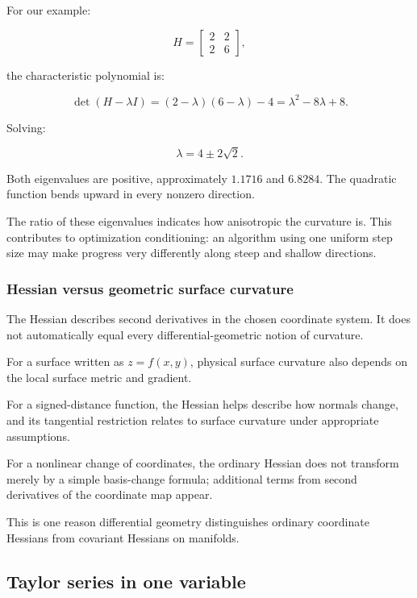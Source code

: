 For our example:

\[
H= \begin{bmatrix}2&2\\2&6\end{bmatrix},
\]

the characteristic polynomial is:

\[
\det(H-\lambda I) =(2-\lambda)(6-\lambda)-4 =\lambda^2-8\lambda+8.
\]

Solving:

\[
\lambda=4\pm2\sqrt2.
\]

Both eigenvalues are positive, approximately \(1.1716\) and \(6.8284\). The quadratic function bends upward in every nonzero direction.

The ratio of these eigenvalues indicates how anisotropic the curvature is. This contributes to optimization conditioning: an algorithm using one uniform step size may make progress very differently along steep and shallow directions.

\subsubsection{Hessian versus geometric surface curvature}\label{02-foundations-ii-ch021-hessian-versus-geometric-surface-curvature}

\hypertarget{02-foundations-ii-ch021-hessian-versus-geometric-surface-curvature}{}

The Hessian describes second derivatives in the chosen coordinate system. It does not automatically equal every differential-geometric notion of curvature.

For a surface written as \(z=f(x,y)\), physical surface curvature also depends on the local surface metric and gradient.

For a signed-distance function, the Hessian helps describe how normals change, and its tangential restriction relates to surface curvature under appropriate assumptions.

For a nonlinear change of coordinates, the ordinary Hessian does not transform merely by a simple basis-change formula; additional terms from second derivatives of the coordinate map appear.

This is one reason differential geometry distinguishes ordinary coordinate Hessians from covariant Hessians on manifolds.

\subsection{Taylor series in one variable}\label{02-foundations-ii-ch021-taylor-series-in-one-variable}

